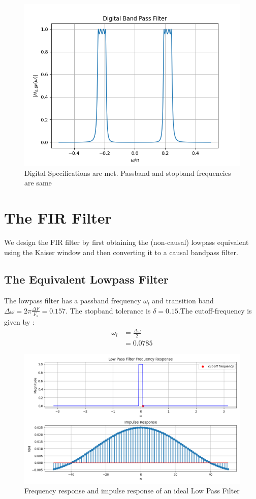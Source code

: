 \documentclass{article}
\begin{document}
\begin{figure}[H]
    \centering
    \includegraphics[width=1\columnwidth]{figs/Digital_BPF.png}
    \caption{Digital Specifications are met. Passband and stopband frequencies are same}
    \label{fig:Digital_BPF}
\end{figure}

\section{The FIR Filter}
We design the FIR filter by first obtaining the (non-causal) lowpass equivalent using the Kaiser window
and then
converting it to a causal bandpass filter.
\subsection{The Equivalent Lowpass Filter}
The lowpass filter has a passband frequency $\omega_l$ and transition band $\Delta \omega = 2\pi \frac{\Delta F}{F_s} = 0.157$.
The stopband tolerance is $\delta=0.15$.The cutoff-frequency is given by :
\begin{align}
    \omega_{l} & = \frac{\Delta \omega}{2} \\
               & = 0.0785
\end{align}
\begin{figure}[H]
    \centering
    \includegraphics[width=1\columnwidth]{figs/LPF_FIR.png}
    \caption{Frequency response and impulse response of an ideal Low Pass Filter}
    \label{fig:LPF_FIR_1}
\end{figure}
\end{document}
